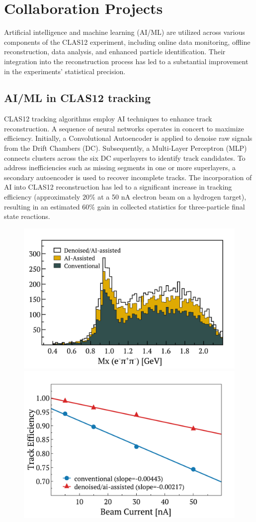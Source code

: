 \section{Collaboration Projects}

Artificial intelligence and machine learning (AI/ML) are utilized across various components of the CLAS12 experiment, including online data monitoring, offline reconstruction, data analysis, and enhanced particle identification. Their integration into the reconstruction process has led to a substantial improvement in the experiments' statistical precision.

\subsection{AI/ML in CLAS12 tracking}

CLAS12 tracking algorithms employ AI techniques to enhance track reconstruction. A sequence of neural networks operates in concert to maximize efficiency. Initially, a Convolutional Autoencoder is applied to denoise raw signals from the Drift Chambers (DC). Subsequently, a Multi-Layer Perceptron (MLP) connects clusters across the six DC superlayers to identify track candidates. To address inefficiencies such as missing segments in one or more superlayers, a secondary autoencoder is used to recover incomplete tracks. The incorporation of AI into CLAS12 reconstruction has led to a significant increase in tracking efficiency (approximately $20\%$ at a 50 nA electron beam on a hydrogen target), resulting in an estimated $60\%$ gain in collected statistics for three-particle final state reactions.

\begin{figure}[h!]
\centering
\includegraphics[width=0.42\columnwidth]{images/projects/figure_denoise_mxp.pdf}
\includegraphics[width=0.42\columnwidth]{images/projects/luminosity_scan.pdf}
\caption{ } 
\label{fig:ai_results}
\end{figure}

